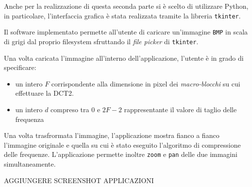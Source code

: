 \documentclass[a4paper, 12pt]{article}
\begin{document}
Anche per la realizzazione di questa seconda parte si è scelto di utilizzare
Python, in particolare, l'interfaccia grafica è stata realizzata tramite la
libreria \texttt{tkinter}.

Il software implementato permette all'utente di caricare un'immagine
\texttt{BMP} in scala di grigi dal proprio filesystem sfruttando il \textit{file
  picker} di \texttt{tkinter}.

Una volta caricata l'immagine all'interno dell'applicazione, l'utente è in grado
di specificare:

\begin{itemize}
  \item un intero $F$ corrispondente alla dimensione in pixel dei
        \textit{macro-blocchi} su cui effettuare la DCT2.
  \item un intero $d$ compreso tra $0$ e $2F - 2$ rappresentante il valore di
        taglio delle frequenza
\end{itemize}

Una volta trasfrormata l'immagine, l'applicazione mostra fianco a fianco
l'immagine originale e quella su cui è stato eseguito l'algoritmo di
compressione delle frequenze. L'applicazione permette inoltre \texttt{zoom} e
\texttt{pan} delle due immagini simultaneamente.

\textsc{AGGIUNGERE SCREENSHOT APPLICAZIONI}
\end{document}
